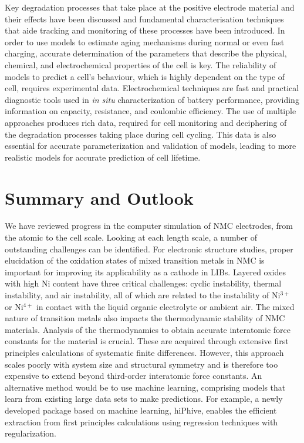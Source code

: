\documentclass[journal=jacsat,manuscript=article]{achemso}
\begin{document}
Key degradation processes that take place at the positive electrode material and their effects have been discussed and fundamental characterisation techniques that aide tracking and monitoring of these processes have been introduced. In order to use models to estimate aging mechanisms during normal or even fast charging, accurate determination of the parameters that describe the physical, chemical, and electrochemical properties of the cell is key. The reliability of models to predict a cell's behaviour, which is highly dependent on the type of cell, requires experimental data. Electrochemical techniques are fast and practical diagnostic tools used in \textit{in situ} characterization of battery performance, providing information on capacity, resistance, and coulombic efficiency. The use of multiple approaches produces rich data, required for cell monitoring and deciphering of the degradation processes taking place during cell cycling. This data is also essential for accurate parameterization and validation of models, leading to more realistic models for accurate prediction of cell lifetime.

\section*{Summary and Outlook}
We have reviewed progress in the computer simulation of NMC electrodes, from the atomic to the cell scale. Looking at each length scale, a number of outstanding challenges can be identified.
For electronic structure studies, proper elucidation of the oxidation states of mixed transition metals in NMC is important for improving its applicability as a cathode in LIBs.
Layered oxides with high Ni content have three critical challenges: cyclic instability, thermal instability, and air instability, all of which are related to the instability of Ni$^{3+}$ or Ni$^{4+}$ in contact with the liquid organic electrolyte or ambient air.\cite{Manthiram-NatComm-2020}
The mixed nature of transition metals also impacts the thermodynamic stability of NMC materials.
Analysis of the thermodynamics to obtain accurate interatomic force constants for the material is crucial.
These are acquired through extensive first principles calculations of systematic finite differences.
However, this approach scales poorly with system size and structural symmetry and is therefore too expensive to extend beyond third-order interatomic force constants.
An alternative method would be to use machine learning, comprising models that learn from existing large data sets to make predictions.
For example, a newly developed package based on machine learning, hiPhive, enables the efficient extraction from first principles calculations using regression techniques with regularization.\cite{eriksson2019hiphive}
\end{document}
